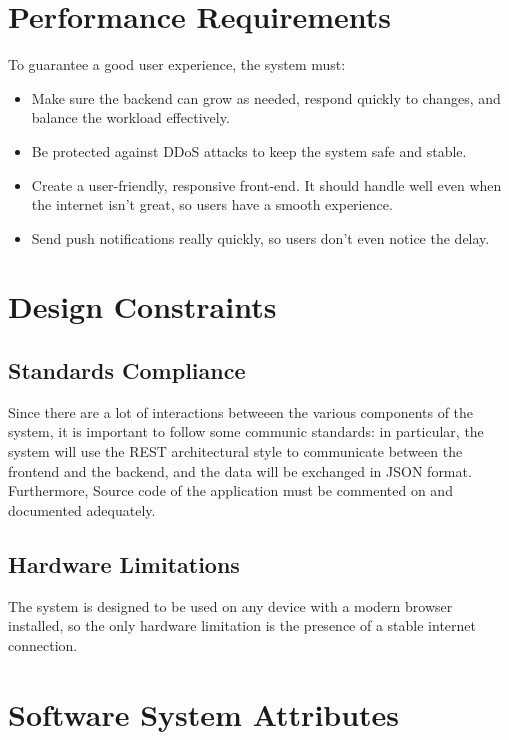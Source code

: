 \section{Performance Requirements}
To guarantee a good user experience, the system must:

\begin{itemize}
    \item Make sure the backend can grow as needed, respond quickly to changes, and balance the workload effectively.
    \item Be protected against DDoS attacks to keep the system safe and stable.
    \item Create a user-friendly, responsive front-end. It should handle well even when the internet isn't great, so users have a smooth experience.
    \item Send push notifications really quickly, so users don't even notice the delay.
\end{itemize}

\section{Design Constraints}

\subsection*{Standards Compliance}
Since there are a lot of interactions betweeen the various components of the system, it is important to follow some communic standards:
in particular, the system will use the REST architectural style to communicate between the frontend and the backend, and the data will be exchanged in JSON format.\\
Furthermore, Source code of the application must be commented on and documented adequately.\\

\subsection*{Hardware Limitations}
The system is designed to be used on any device with a modern browser installed, so the only hardware limitation is the presence of a stable internet connection.\\

\section{Software System Attributes}

